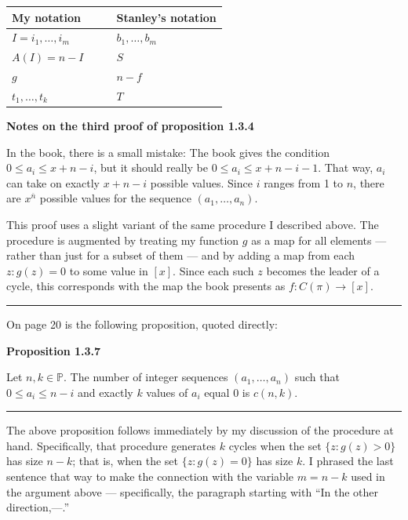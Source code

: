 \documentclass[]{article}
\begin{document}
\begin{longtable}[]{@{}lll@{}}
\toprule
My notation & \(\quad\) & Stanley's notation\tabularnewline
\midrule
\endhead
\(I = i_1, \ldots, i_m\) & & \(b_1, \ldots, b_m\)\tabularnewline
\(A(I) = n - I\) & & \(S\)\tabularnewline
\(g\) & & \(n - f\)\tabularnewline
\(t_1, \ldots, t_k\) & & \(T\)\tabularnewline
\bottomrule
\end{longtable}

\textbf{Notes on the third proof of proposition 1.3.4}

In the book, there is a small mistake: The book gives the condition
\(0 \le a_i \le x + n - i\), but it should really be
\(0 \le a_i \le x + n - i - 1\). That way, \(a_i\) can take on exactly
\(x + n - i\) possible values. Since \(i\) ranges from 1 to \(n\), there
are \(x^{\overline{n}}\) possible values for the sequence
\((a_1, \ldots, a_n)\).

This proof uses a slight variant of the same procedure I described
above. The procedure is augmented by treating my function \(g\) as a map
for all elements --- rather than just for a subset of them --- and by
adding a map from each \(z : g(z) = 0\) to some value in \([x]\). Since
each such \(z\) becomes the leader of a cycle, this corresponds with the
map the book presents as \(f:C(\pi) \to [x]\).

\begin{center}\rule{0.5\linewidth}{\linethickness}\end{center}

On page 20 is the following proposition, quoted directly:

\textbf{Proposition 1.3.7}

Let \(n, k\in\mathbb{P}\). The number of integer sequences
\((a_1, \ldots, a_n)\) such that \(0 \le a_i \le n-i\) and exactly \(k\)
values of \(a_i\) equal 0 is \(c(n, k)\).

\begin{center}\rule{0.5\linewidth}{\linethickness}\end{center}

The above proposition follows immediately by my discussion of the
procedure at hand. Specifically, that procedure generates \(k\) cycles
when the set \(\{z : g(z) > 0\}\) has size \(n - k\); that is, when the
set \(\{z : g(z) = 0\}\) has size \(k\). I phrased the last sentence
that way to make the connection with the variable \(m = n-k\) used in
the argument above --- specifically, the paragraph starting with ``In
the other direction,---.''
\end{document}
